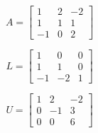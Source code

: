 \[
A=\left[
\begin{array}{ccc}
1 & 2 & -2 \\
1 & 1 & 1\\
-1 & 0 & 2
\end{array}\right]
\]

\medskip
\[ 
L=\left[
\begin{array}{ccc}
1 & 0 & 0 \\
1 & 1 & 0\\
-1 & -2 & 1
\end{array}
\right]
\]

\[ 
U=\left[
\begin{array}{ccc}
 1& 2 & -2 \\
 0 & -1 & 3 \\
 0 & 0 & 6
\end{array}
\right] 
\]
